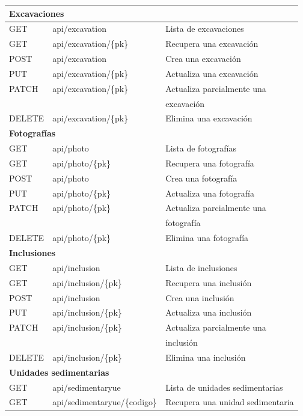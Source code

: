 \begin{longtable}[H]{|l|l|l|}
    \hline\hline
    \multicolumn{3}{|l|}{\textbf{Excavaciones}} \\
    \hline
    GET & api/excavation & Lista de excavaciones \\
    GET & api/excavation/\{pk\} & Recupera una excavación\\
    POST & api/excavation & Crea una excavación \\
    PUT & api/excavation/\{pk\} & Actualiza una excavación \\
    PATCH & api/excavation/\{pk\} & Actualiza parcialmente una \\
    &  & excavación \\
    DELETE & api/excavation/\{pk\} & Elimina una excavación \\
    \hline\hline
    \multicolumn{3}{|l|}{\textbf{Fotografías}} \\
    \hline
    GET & api/photo & Lista de fotografías \\
    GET & api/photo/\{pk\} & Recupera una fotografía \\
    POST & api/photo & Crea una fotografía \\
    PUT & api/photo/\{pk\} & Actualiza una fotografía \\
    PATCH & api/photo/\{pk\} & Actualiza parcialmente una \\
    &  & fotografía \\
    DELETE & api/photo/\{pk\} & Elimina una fotografía \\
    \hline\hline
    \multicolumn{3}{|l|}{\textbf{Inclusiones}} \\
    \hline
    GET & api/inclusion & Lista de inclusiones \\
    GET & api/inclusion/\{pk\} & Recupera una inclusión \\
    POST & api/inclusion & Crea una inclusión \\
    PUT & api/inclusion/\{pk\} & Actualiza una inclusión\\
    PATCH & api/inclusion/\{pk\} & Actualiza parcialmente una \\
    &  & inclusión \\
    DELETE & api/inclusion/\{pk\} & Elimina una inclusión \\
    \hline\hline
    \multicolumn{3}{|l|}{\textbf{Unidades sedimentarias}} \\
    \hline
    GET & api/sedimentaryue & Lista de unidades sedimentarias \\
    GET & api/sedimentaryue/\{codigo\} & Recupera una unidad sedimentaria \\

\end{longtable}
